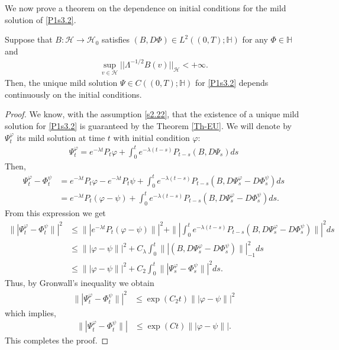 \documentclass[review, onefignum, onetabnum]{siamart171218}
\begin{document}
 We now prove a theorem on the dependence on initial conditions for the mild 
solution of \eqref{P1s3.2}.
 \begin{theorem}\label{Cont-Mild-Sol}
Suppose that $B:\mathcal{H}\rightarrow \mathcal{H}_0$ satisfies $(B,D\Phi)\in 
L^2((0,T);\mathbb{H})$ for any $\Phi\in\mathbb{H}$ and 
 \begin{align}\label{s2.22}
  \sup_{v\in \mathcal{H}} ||\Lambda^{-1/2}B(v)||_{\mathcal{H}}<+\infty.
 \end{align}
 Then, the unique mild solution $\Psi\in C((0,T); \mathbb{H})$ for 
\eqref{P1s3.2} depends continuously on the initial conditions. 
  
 \end{theorem}
\begin{proof}
We know, with the assumption \eqref{s2.22}, that the existence of a unique 
mild solution for \eqref{P1s3.2} is guaranteed by the Theorem \ref{Th-EU}. We 
will denote by $\Psi_t^\varphi$ its mild solution at time $t$ with initial 
condition $\varphi$:
\begin{align*}
\Psi_t^\varphi=e^{-\lambda t} P_t  \varphi+  \int_0^t e^{-\lambda 
(t-s)}P_{t-s}(B,D\Psi_s) ds
\end{align*}
Then, 
\begin{align*}
\Psi_t^\varphi-\Phi_t^\psi&=e^{-\lambda t} P_t \varphi -e^{-\lambda t} P_t 
\psi+  \int_0^t e^{-\lambda (t-s)}P_{t-s}(B,D\Psi_s^\varphi-D\Phi_s^\psi) ds\\
&= e^{-\lambda t} P_t (\varphi - \psi)+  \int_0^t e^{-\lambda 
(t-s)}P_{t-s}(B,D\Psi_s^\varphi-D\Phi_s^\psi) ds.
\end{align*}
From this expression we get
\begin{align*}
\| | \Psi_t^\varphi-\Phi_t^\psi\| |^2&\le \| |e^{-\lambda t} P_t (\varphi - 
\psi)\| |^2+\| | \int_0^t e^{-\lambda 
(t-s)}P_{t-s}(B,D\Psi_s^\varphi-D\Phi_s^\psi) \| |^2ds\\
&\le  \|  |\varphi - \psi\| |^2+ C_\lambda\int_0^t  \| 
|(B,D\Psi_s^\varphi-D\Phi_s^\psi) \| |_{-1}^2 ds\\
&\le  \|  |\varphi - \psi\| |^2+ C_2\int_0^t  \| |\Psi_s^\varphi-\Phi_s^\psi 
\| |^2 ds.
\end{align*}
Thus, by Gronwall's inequality we obtain
\begin{align}\label{s2.23}
\| | \Psi_t^\varphi-\Phi_t^\psi\| |^2&\le \exp(C_2t)  \|  | \varphi - \psi\| 
|^2
\end{align}
which implies, 
\begin{align*}
\| | \Psi_t^\varphi-\Phi_t^\psi\| |&\le \exp(Ct)  \| | \varphi - \psi\| |.
\end{align*}
This completes the proof.
\end{proof}
\end{document}
